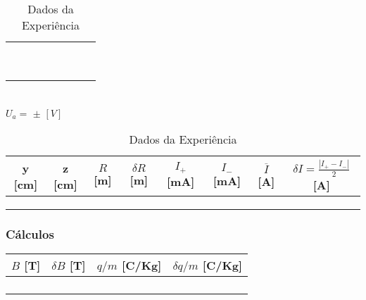 \documentclass[a4paper,12pt]{article}  %
\begin{document}
\begin{table}[!hbp]
\begin{tabular}{|c|c|c|c|c|c|c|c|}
	 &  &  &  & &  & & \\ \cline{5-6}
	 \hline
	 &  &  &  & &  & & \\ \cline{5-6}
	 &  &  &  & &  & & \\ \cline{5-6}
	 &  &  &  & &  & & \\ \cline{5-6}
	 \hline
	 &  &  &  & &  & & \\ \cline{5-6}
	 &  &  &  & &  & & \\ \cline{5-6}
	 &  &  &  & &  & & \\ \cline{5-6}
	 \hline
	 &  &  &  & &  & & \\ \cline{5-6}
	 &  &  &  & &  & & \\ \cline{5-6}
	 &  &  &  & &  & & \\ \cline{5-6}
	 \hline
 	\end{tabular}\\
\noindent	$U_a =$ \underline{\makebox[1.5cm][r]{~}} $\pm$ \underline{\makebox[1cm][r]{~}} $[V]$ \\
	\begin{tabular}{|c|c|c|c|c|c|c|c|}
	\hline
	y [cm]  & z [cm]  & $R$ [m] & $\delta R$ [m] & $I_+$ [mA] & $I_-$ [mA] & $\overline{I}$ [A]	& $\delta I = \frac{| I_+ - I_-|}{2}$ [A]  \\
	\hline
	 &  &  &  & &  &  & \\ \cline{5-6}
	 &  &  &  & &  & & \\ \cline{5-6}
	 &  &  &  & &  & & \\ \cline{5-6}
	 \hline
 	\end{tabular}	 	
	\caption{Dados da Experiência} 
	\label{tab:Dados}
\end{table}

\subsubsection{\sf Cálculos}

\begin{center}
	\begin{tabular}{|c|c|c|c|}
	\hline
	$B$ [T] & $\delta B$  [T] & $q/m$ [C/Kg] & $\delta q/m$ [C/Kg] \\
	\hline
	 &  &  &  \\
	\hline
	 &  &  &  \\
	\hline
	 &  &  &  \\
	\hline
	 &  &  &  \\
	 \hline
 	\end{tabular}
\end{center}
\end{document}
